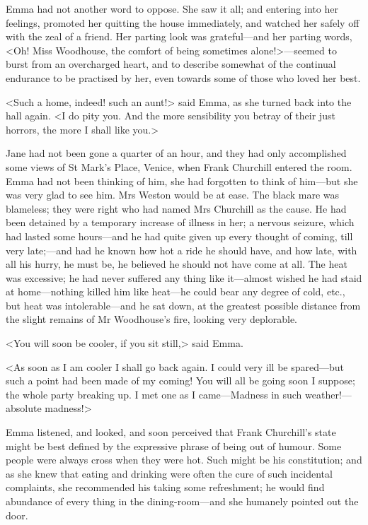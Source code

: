 Emma had not another word to oppose. She saw it all; and entering into her feelings, promoted her quitting the house immediately, and watched her safely off with the zeal of a friend. Her parting look was grateful—and her parting words, <Oh! Miss Woodhouse, the comfort of being sometimes alone!>—seemed to burst from an overcharged heart, and to describe somewhat of the continual endurance to be practised by her, even towards some of those who loved her best.

<Such a home, indeed! such an aunt!> said Emma, as she turned back into the hall again. <I do pity you. And the more sensibility you betray of their just horrors, the more I shall like you.>

Jane had not been gone a quarter of an hour, and they had only accomplished some views of St Mark's Place, Venice, when Frank Churchill entered the room. Emma had not been thinking of him, she had forgotten to think of him—but she was very glad to see him. Mrs Weston would be at ease. The black mare was blameless; they were right who had named Mrs Churchill as the cause. He had been detained by a temporary increase of illness in her; a nervous seizure, which had lasted some hours—and he had quite given up every thought of coming, till very late;—and had he known how hot a ride he should have, and how late, with all his hurry, he must be, he believed he should not have come at all. The heat was excessive; he had never suffered any thing like it—almost wished he had staid at home—nothing killed him like heat—he could bear any degree of cold, etc., but heat was intolerable—and he sat down, at the greatest possible distance from the slight remains of Mr Woodhouse's fire, looking very deplorable.

<You will soon be cooler, if you sit still,> said Emma.

<As soon as I am cooler I shall go back again. I could very ill be spared—but such a point had been made of my coming! You will all be going soon I suppose; the whole party breaking up. I met one as I came—Madness in such weather!—absolute madness!>

Emma listened, and looked, and soon perceived that Frank Churchill's state might be best defined by the expressive phrase of being out of humour. Some people were always cross when they were hot. Such might be his constitution; and as she knew that eating and drinking were often the cure of such incidental complaints, she recommended his taking some refreshment; he would find abundance of every thing in the dining-room—and she humanely pointed out the door.


